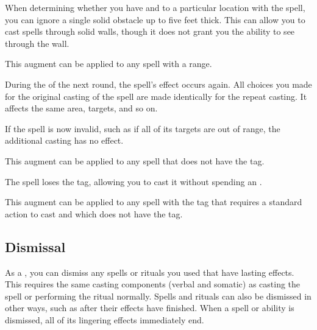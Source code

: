              When determining whether you have  and  to a particular location with the spell, you can ignore a single solid obstacle up to five feet thick.
            This can allow you to cast spells through solid walls, though it does not grant you the ability to see through the wall.
            \par This augment can be applied to any spell with a range.


             During the  of the next round, the spell's effect occurs again.
            All choices you made for the original casting of the spell are made identically for the repeat casting.
            It affects the same area, targets, and so on.

            If the spell is now invalid, such as if all of its targets are out of range, the additional casting has no effect.
            \par This augment can be applied to any spell that does not have the  tag.

             The spell loses the  tag, allowing you to cast it without spending an .
            \par This augment can be applied to any spell with the  tag that requires a standard action to cast and which does not have the  tag.

    \subsection{Dismissal}
        As a , you can dismiss any spells or rituals you used that have lasting effects.
        This requires the same casting components (verbal and somatic) as casting the spell or performing the ritual normally.
        Spells and rituals can also be dismissed in other ways, such as after their effects have finished.
        When a spell or ability is dismissed, all of its lingering effects immediately end.

